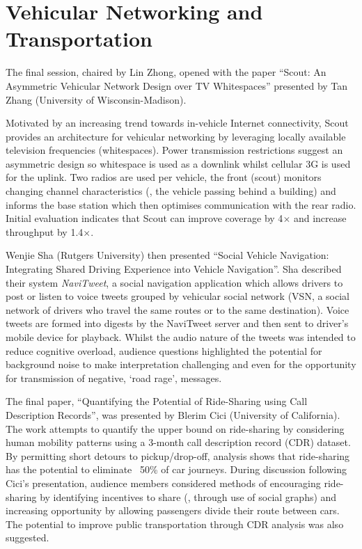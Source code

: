 \section{Vehicular Networking and Transportation}
\label{sec:vehiclenets}
The final session, chaired by Lin Zhong, opened with the paper ``Scout: An 
Asymmetric Vehicular Network Design over TV Whitespaces'' presented by Tan Zhang 
(University of Wisconsin-Madison).

Motivated by an increasing trend towards in-vehicle Internet connectivity, Scout 
provides an architecture for vehicular networking by leveraging locally available 
television frequencies (whitespaces). Power transmission restrictions suggest an 
asymmetric design so whitespace is used as a downlink whilst cellular 3G is 
used for the uplink. Two radios are used per vehicle, the front (scout) 
monitors changing channel characteristics (\eg{}, the vehicle passing behind a 
building) and informs the base station which then optimises communication with 
the rear radio. Initial evaluation indicates that Scout can improve coverage by 
4$\times$ and increase throughput by 1.4$\times$.

Wenjie Sha (Rutgers University) then presented ``Social Vehicle Navigation: 
Integrating Shared Driving Experience into Vehicle Navigation''. Sha described 
their system \emph{NaviTweet}, a social navigation application which allows drivers 
to post or listen to voice tweets grouped by vehicular social 
network (VSN, a social network of drivers who travel the same routes or to the 
same destination). Voice tweets are formed into digests by the 
NaviTweet server and then sent to driver's mobile device for playback.
Whilst the audio nature of the tweets 
was intended to reduce cognitive overload, audience questions highlighted the 
potential for background noise to make interpretation challenging and even for 
the opportunity for transmission of negative, `road rage', messages.

The final paper, ``Quantifying the Potential of Ride-Sharing using Call 
Description Records'', was presented by Blerim Cici (University of California). 
The work attempts to quantify the upper bound on ride-sharing 
by considering human mobility patterns using a 
3-month call description record (CDR) dataset.
By permitting short detours to pickup\slash drop-off,
analysis shows that ride-sharing has the potential to eliminate ~50\% of car 
journeys. During discussion following Cici's presentation, audience members
considered methods of encouraging ride-sharing by identifying incentives to
share (\eg{}, through use of social graphs) and increasing opportunity by 
allowing passengers divide their route between cars. The potential to
improve public transportation through CDR analysis was also suggested.